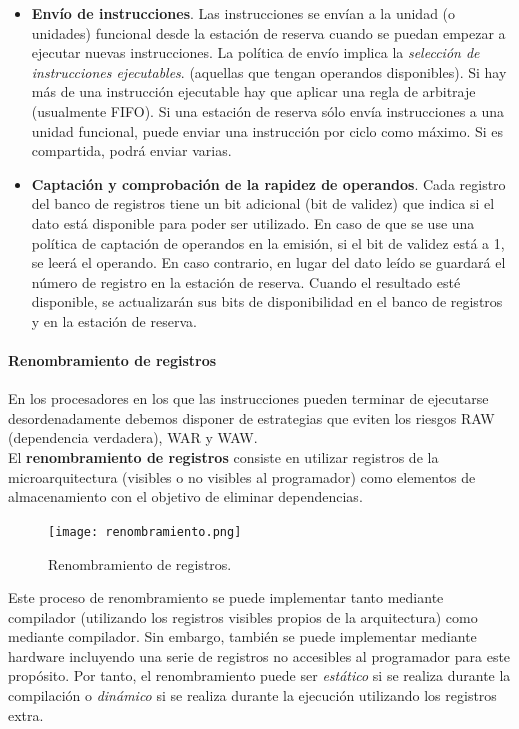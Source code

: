\documentclass[12pt,spanish]{article}
\begin{document}
\begin{itemize}
	\item \textbf{Envío de instrucciones}. Las instrucciones se envían a la unidad (o unidades) funcional desde la estación de reserva cuando se puedan empezar a ejecutar nuevas instrucciones. La política de envío implica la \emph{selección de instrucciones ejecutables}. (aquellas que tengan operandos disponibles). Si hay más de una instrucción ejecutable hay que aplicar una regla de arbitraje (usualmente FIFO). Si una estación de reserva sólo envía instrucciones a una unidad funcional, puede enviar una instrucción por ciclo como máximo. Si es compartida, podrá enviar varias.
	\item \textbf{Captación y comprobación de la rapidez de operandos}. Cada registro del banco de registros tiene un bit adicional (bit de validez) que indica si el dato está disponible para poder ser utilizado. En caso de que se use una política de captación de operandos en la emisión, si el bit de validez está a 1, se leerá el operando. En caso contrario, en lugar del dato leído se guardará el número de registro en la estación de reserva. Cuando el resultado esté disponible, se actualizarán sus bits de disponibilidad en el banco de registros y en la estación de reserva.
\end{itemize}

\paragraph{Renombramiento de registros\\}

En los procesadores en los que las instrucciones pueden terminar de ejecutarse desordenadamente debemos disponer de estrategias que eviten los riesgos RAW (dependencia verdadera), WAR y WAW.\\

El \textbf{renombramiento de registros} consiste en utilizar registros de la microarquitectura (visibles o no visibles al programador) como elementos de almacenamiento con el objetivo de eliminar dependencias.

\begin{figure}[H]
\centering
\texttt{[image: renombramiento.png]}
\caption{Renombramiento de registros.}
\end{figure}

Este proceso de renombramiento se puede implementar tanto mediante compilador (utilizando los registros visibles propios de la arquitectura) como mediante compilador. Sin embargo, también se puede implementar mediante hardware incluyendo una serie de registros no accesibles al programador para este propósito. Por tanto, el renombramiento puede ser \emph{estático} si se realiza durante la compilación o \emph{dinámico} si se realiza durante la ejecución utilizando los registros extra. \\
\end{document}

